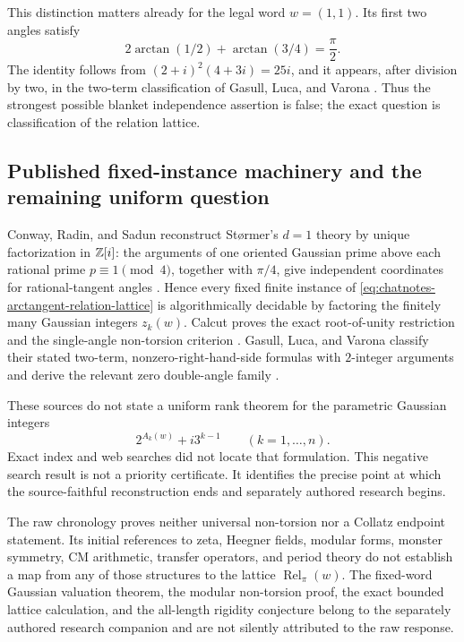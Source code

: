 This distinction matters already for the legal word \(w=(1,1)\).  Its first
two angles satisfy
\begin{equation}
\label{eq:chatnotes-arctangent-exceptional-seed}
 2\arctan(1/2)+\arctan(3/4)=\frac{\pi}{2}.
\end{equation}
The identity follows from
\((2+i)^2(4+3i)=25i\), and it appears, after division by two, in the
two-term classification of Gasull, Luca, and Varona
\cite[Theorem~1]{GasullLucaVarona2023}.  Thus the strongest possible blanket
independence assertion is false; the exact question is classification of the
relation lattice.

\subsection{Published fixed-instance machinery and the remaining uniform question}

Conway, Radin, and Sadun reconstruct St\o rmer's \(d=1\) theory by unique
factorization in \(\mathbb{Z}[i]\): the arguments of one oriented Gaussian prime above
each rational prime \(p\equiv1\pmod4\), together with \(\pi/4\), give
independent coordinates for rational-tangent angles
\cite[Theorems~1--2 and Section~2]{ConwayRadinSadun1999}.  Hence every fixed
finite instance of \eqref{eq:chatnotes-arctangent-relation-lattice} is
algorithmically decidable by factoring the finitely many Gaussian integers
\(z_k(w)\).  Calcut proves the exact root-of-unity restriction and the
single-angle non-torsion criterion \cite[Main Lemma and
Corollaries~1--3]{Calcut2009}.  Gasull, Luca, and Varona classify their stated
two-term, nonzero-right-hand-side formulas with \(2\)-integer arguments and
derive the relevant zero double-angle family
\cite[Section~2]{GasullLucaVarona2023}.

These sources do not state a uniform rank theorem for the parametric Gaussian
integers
\[
 2^{A_k(w)}+i3^{k-1}\qquad(k=1,\ldots,n).
\]
Exact index and web searches did not locate that formulation.  This negative
search result is not a priority certificate.  It identifies the precise point
at which the source-faithful reconstruction ends and separately authored
research begins.

\begin{nonclaim}
The raw chronology proves neither universal non-torsion nor a Collatz endpoint
statement.  Its initial references to zeta, Heegner fields, modular forms,
monster symmetry, CM arithmetic, transfer operators, and period theory do not
establish a map from any of those structures to the lattice
\(\operatorname{Rel}_{\pi}(w)\).  The fixed-word Gaussian valuation theorem,
the modular non-torsion proof, the exact bounded lattice calculation, and the
all-length rigidity conjecture belong to the separately authored research
companion and are not silently attributed to the raw response.
\end{nonclaim}
